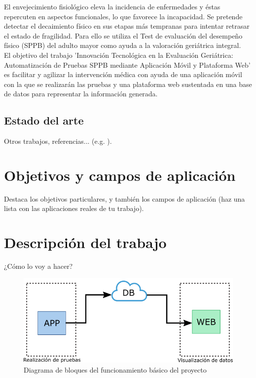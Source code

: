 \documentclass[12pt,oneside,a4paper]{article}
\begin{document}
El envejecimiento fisiológico eleva la incidencia de enfermedades y éstas repercuten en aspectos funcionales, lo que favorece la incapacidad. Se pretende detectar el decaimiento físico en sus etapas más tempranas para intentar retrasar el estado de fragilidad. Para ello se utiliza el Test de evaluación del desempeño físico (SPPB) del adulto mayor como ayuda a la valoración geriátrica integral. \\
El objetivo del trabajo 'Innovación Tecnológica en la Evaluación Geriátrica: Automatización de Pruebas SPPB mediante Aplicación Móvil y Plataforma Web' es facilitar y agilizar la intervención médica con ayuda de una aplicación móvil con la que se realizarán las pruebas y una plataforma web sustentada en una base de datos para representar la información generada.


\subsection{Estado del arte}
Otros trabajos, referencias... (e.g. \cite{bibtex}).

\section{Objetivos y campos de aplicación}
Destaca los objetivos particulares, y también los campos de aplicación (haz una lista con las aplicaciones reales de tu trabajo).

\section{Descripción del trabajo}
¿Cómo lo voy a hacer?
\begin{figure}[H]
  \centering
  \includegraphics[width=15cm]{anteproyecto/figuras/tfg_diagramabloques_simple.png}
  \caption{Diagrama de bloques del funcionamiento básico del proyecto}
  \label{fig:ejemplo}
\end{figure}
\end{document}
